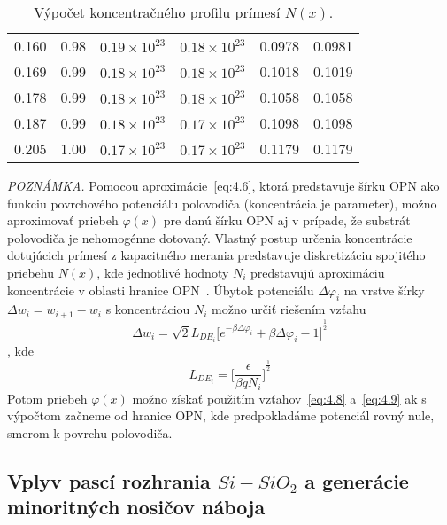 \begin{table}[h!]
\begin{minipage}[c]{\myfiguresize}
\begin{center}
\begin{tabular}{c c c c c c}
      0.160 & 0.98 & $0.19\times10^{23}$ & $0.18\times10^{23}$ & 0.0978 & 0.0981 \\
      0.169 & 0.99 & $0.18\times10^{23}$ & $0.18\times10^{23}$ & 0.1018 & 0.1019 \\
      0.178 & 0.99 & $0.18\times10^{23}$ & $0.18\times10^{23}$ & 0.1058 & 0.1058 \\
      0.187 & 0.99 & $0.18\times10^{23}$ & $0.17\times10^{23}$ & 0.1098 & 0.1098 \\
      0.205 & 1.00 & $0.17\times10^{23}$ & $0.17\times10^{23}$ & 0.1179 & 0.1179 \\
      \end{tabular}
      \caption[Výpočet koncentračného profilu prímesí $N(x)$]{Výpočet
        koncentračného profilu prímesí $N(x)$.}\label{tab:4.1}
    \end{center}
  \end{minipage}
\end{table}

\begin{minipage}[c]{\textwidth}
  \emph{POZNÁMKA.} Pomocou aproximácie~\ref{eq:4.6}, ktorá predstavuje
  šírku OPN ako funkciu povrchového potenciálu polovodiča
  (koncentrácia je parameter), možno aproximovať priebeh $\varphi(x)$
  pre danú šírku OPN aj v prípade, že substrát polovodiča je
  nehomogénne dotovaný.  Vlastný postup určenia koncentrácie
  dotujúcich prímesí z kapacitného merania predstavuje diskretizáciu
  spojitého priebehu $N(x)$, kde jednotlivé hodnoty $N_i$ predstavujú
  aproximáciu koncentrácie v oblasti hranice OPN~\cite{4.1, 4.2, 4.3}.
  Úbytok potenciálu $\Delta\varphi_i$ na vrstve šírky $\Delta
  w_{i}=w_{i+1}-w_{i}$ s koncentráciou $N_i$ možno určiť riešením
  vzťahu
  \begin{equation}\label{eq:4.8}
    \Delta w_{i} = \sqrt{2}L_{DE_{i}}{\Big[e^{-\beta\Delta\varphi_{i}} + \beta\Delta\varphi_{i} - 1\Big]}^{\frac{1}{2}}
  \end{equation}
  , kde%
  \begin{equation}\label{eq:4.9}
    L_{DE_{i}} = {\bigg[\frac{\epsilon}{\beta qN_{i}}\bigg]}^{\frac{1}{2}}
  \end{equation}
  Potom priebeh $\varphi(x)$ možno získať použitím
  vzťahov~\ref{eq:4.8} a~\ref{eq:4.9} ak s výpočtom začneme od hranice
  OPN, kde predpokladáme potenciál rovný nule, smerom k povrchu
  polovodiča.
\end{minipage}

\subsection[Vplyv pascí rozhrania $Si-SiO_{2}$ a generácie minoritných nosičov náboja.]{Vplyv pascí rozhrania $Si-SiO_{2}$ a generácie minoritných nosičov náboja}\label{sec:4.1.3}

